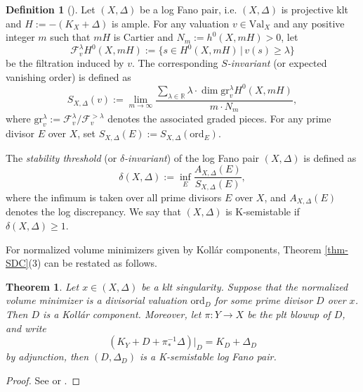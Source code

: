 \documentclass[12pt]{amsart}
\newtheorem{thm}[prop]{Theorem}
\theoremstyle{definition}
\newtheorem{defn}[prop]{Definition}
\newcommand{\bR}{\mathbb{R}}
\newcommand{\cF}{\mathcal{F}}
\newcommand{\rd}{\mathrm{d}}
\newcommand{\vol}{\mathrm{vol}}
\newcommand{\ord}{\mathrm{ord}}
\newcommand{\Val}{\mathrm{Val}}
\newcommand{\gr}{\mathrm{gr}}
\numberwithin{equation}{section}
\begin{document}
\begin{defn}[\cite{FO-delta,BJ-delta}] \label{def:Fano K-ss}
Let $(X, \Delta)$ be a log Fano pair, i.e. $(X,\Delta)$ is projective klt and $H:=-(K_X+\Delta)$ is ample. For any valuation $v\in \Val_X$ and any positive integer $m$ such that $mH$ is Cartier and $N_m:=h^0(X,mH)>0$, let 
\[
\cF_v^\lambda H^0(X, mH) := \{s \in H^0(X, mH) \,|\, v(s) \geq \lambda\}
\]
be the filtration induced by $v$.
The corresponding \emph{$S$-invariant} (or expected vanishing order) is defined as
\[
S_{X,\Delta}(v) := \lim_{m \to \infty} \frac{\sum_{\lambda\in\bR} \lambda \cdot \dim \gr_v^\lambda H^0(X, mH)}{m \cdot N_m},
\]
where $\gr_v^\lambda := \cF_v^\lambda / \cF_v^{>\lambda}$ denotes the associated graded pieces. For any prime divisor $E$ over $X$, set $S_{X,\Delta}(E):=S_{X,\Delta}(\ord_E)$.

The \emph{stability threshold} (or \emph{$\delta$-invariant}) of the log Fano pair $(X, \Delta)$ is defined as
\[
\delta(X, \Delta) := \inf_{E} \frac{A_{X,\Delta}(E)}{S_{X,\Delta}(E)},
\]
where the infimum is taken over all prime divisors $E$ over $X$, and $A_{X,\Delta}(E)$ denotes the log discrepancy. We say that $(X, \Delta)$ is K-semistable if $\delta(X, \Delta) \geq 1$.
\end{defn}

For normalized volume minimizers given by Koll\'ar components, Theorem \ref{thm-SDC}(3) can be restated as follows.

\begin{thm} \label{thm:kc K-ss}
Let $x \in (X, \Delta)$ be a klt singularity. Suppose that the normalized volume minimizer is a divisorial valuation $\ord_D$ for some prime divisor $D$ over $x$. Then $D$ is a Koll\'ar component. Moreover, let $\pi\colon Y \to X$ be the plt blowup of $D$, and write 
\[
(K_Y + D + \pi_*^{-1}\Delta)|_D = K_D + \Delta_D
\]
by adjunction, then $(D, \Delta_D)$ is a K-semistable log Fano pair.
\end{thm}

\begin{proof}
See \cite[Theorem 1.2]{LX-Kol-comp-stab} or \cite[Theorems 3.6 and 3.10]{XZ-uniqueness}.
\end{proof}
\end{document}
